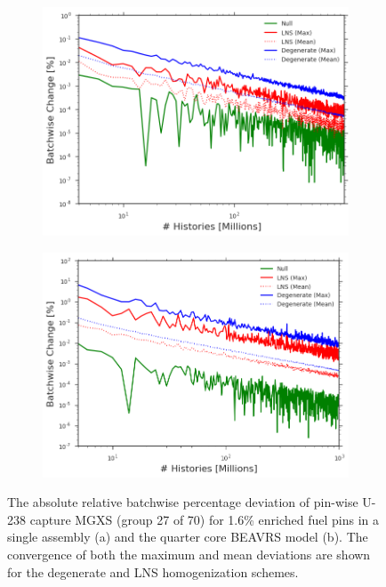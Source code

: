 \begin{figure}[h!]
\centering
\begin{subfigure}{.87\textwidth}
  \centering
  \includegraphics[width=\linewidth]{figures/patterns/convergence/assm-16/assm-16-dev-capture-27}
  \caption{}
  \label{fig:chap9-assm-16-dev-capt-27}
\end{subfigure}
\begin{subfigure}{.87\textwidth}
  \centering
  \includegraphics[width=\linewidth]{figures/patterns/convergence/full-core/16-enr-capt}
  \caption{}
  \label{fig:chap9-full-core-dev-capt-27}
\end{subfigure}
\caption[Convergence of U-238 capture MGXS batchwise deviation]{The absolute relative batchwise percentage deviation of pin-wise U-238 capture \ac{MGXS} (group 27 of 70) for 1.6\% enriched fuel pins in a single assembly (a) and the quarter core \ac{BEAVRS} model (b). The convergence of both the maximum and mean deviations are shown for the degenerate and \ac{LNS} homogenization schemes.}
\label{fig:chap9-capt-27-dev}
\end{figure}

